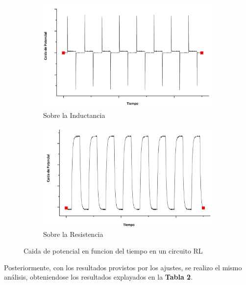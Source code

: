 \documentclass[11pt,a4paper]{article}
\begin{document}
\begin{figure}[H]

\begin{subfigure}{0.5\textwidth}
\includegraphics[scale=0.3]{RL-Caida_en_Inductancia}
  \caption{Sobre la Inductancia}
  \label{subfig:RL_CI}
\end{subfigure}
\begin{subfigure}{0.5\textwidth}
\includegraphics[scale=0.3]{RL-Caida_en_Resistencia}
  \caption{Sobre la Resistencia}
  \label{subfig:RL_CR}
\end{subfigure}
  \caption{Caida de potencial en funcion del tiempo en un circuito RL}
  \label{fig:RL_C}
\end{figure}

Posteriormente, con los resultados provistos por los ajustes, se realizo el mismo análisis, obteniendose los resultados explayados en la \textbf{Tabla 2}.
\end{document}
